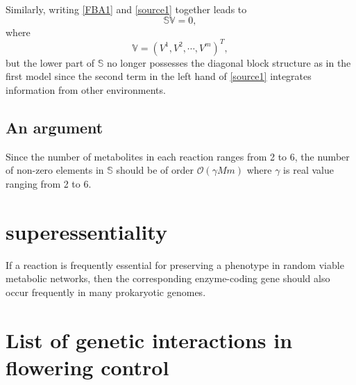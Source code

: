 \documentclass[paper=a4, fontsize=12pt]{scrartcl}	%
\numberwithin{equation}{section}					%
\numberwithin{figure}{section}					%
\numberwithin{table}{section}					%
\begin{document}
Similarly, writing \eqref{FBA1} and \eqref{source1} together leads to 
\begin{equation}
\mathbb S \mathbb V=0,
\end{equation}
where 
\begin{equation}
\nonumber \mathbb V=(V^1, V^2, \cdots, V^m)^T,
\end{equation}
but the lower part of $\mathbb S$ no longer possesses the diagonal block structure as in the first model since the second term in the left hand of \eqref{source1} integrates information from other environments. 

\subsection*{An argument}

Since the number of metabolites in each reaction ranges from 2 to 6, the number of non-zero elements in $\mathbb S$ should be of order $\mathcal O(\gamma Mm)$ where $\gamma$ is real value ranging from 2 to 6.


\section{superessentiality}

If a reaction is frequently essential for preserving a phenotype in random viable metabolic networks, then the corresponding enzyme-coding gene should also occur frequently in many prokaryotic genomes.

\section{List of genetic interactions in flowering control}
\end{document}
